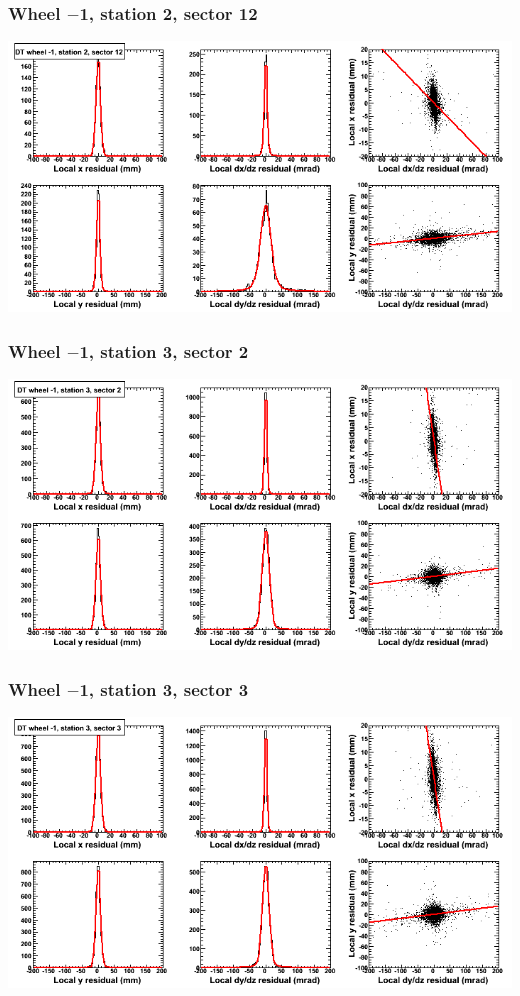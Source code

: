 \documentclass[compress]{beamer}
\begin{document}
\begin{frame}
\frametitle{Wheel $-$1, station 2, sector 12}
\includegraphics[width=\linewidth]{tmpbell_MBwhBst2sec12.png}
\end{frame}

\begin{frame}
\frametitle{Wheel $-$1, station 3, sector 2}
\includegraphics[width=\linewidth]{tmpbell_MBwhBst3sec02.png}
\end{frame}

\begin{frame}
\frametitle{Wheel $-$1, station 3, sector 3}
\includegraphics[width=\linewidth]{tmpbell_MBwhBst3sec03.png}
\end{frame}
\end{document}
